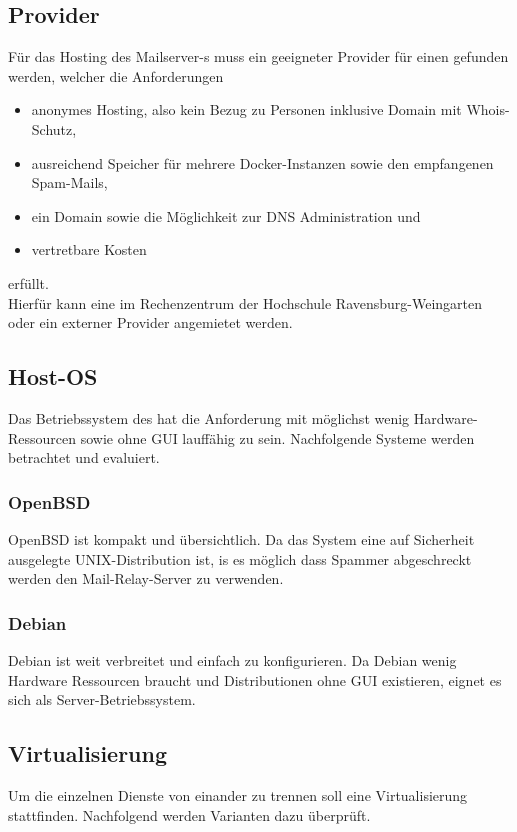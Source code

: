 \documentclass[a4paper,11pt,singlespacing]{article}
\begin{document}
	\subsection{Provider}\label{sec:Provider}
		Für das Hosting des Mailserver-s muss ein geeigneter Provider für einen  gefunden werden, welcher die Anforderungen
		\begin{itemize}
			\item anonymes Hosting, also kein Bezug zu Personen inklusive Domain mit Whois-Schutz,
			\item ausreichend Speicher für mehrere Docker-Instanzen sowie den empfangenen Spam-Mails,
			\item ein Domain sowie die Möglichkeit zur DNS Administration und
			\item vertretbare Kosten
		\end{itemize}
		erfüllt.\\
		Hierfür kann eine  im Rechenzentrum der Hochschule Ravensburg-Weingarten oder ein externer Provider angemietet werden.

	\subsection{Host-OS}\label{sec:Host-Maschine}
		Das Betriebssystem des  hat die Anforderung mit möglichst wenig Hardware-Ressourcen sowie ohne GUI lauffähig zu sein.
		Nachfolgende Systeme werden betrachtet und evaluiert.

		\subsubsection{OpenBSD}\label{sec:OpenBSD}
			OpenBSD ist kompakt und übersichtlich.
			Da das System eine auf Sicherheit ausgelegte UNIX-Distribution ist, is es möglich dass Spammer abgeschreckt werden den Mail-Relay-Server zu verwenden.

		\subsubsection{Debian}\label{sec:Debian}
			Debian ist weit verbreitet und einfach zu konfigurieren.
			Da Debian wenig Hardware Ressourcen braucht und Distributionen ohne GUI existieren, eignet es sich als Server-Betriebssystem.

	\subsection{Virtualisierung}\label{sec:Virtualisierung}
		Um die einzelnen Dienste von einander zu trennen soll eine Virtualisierung stattfinden.
		Nachfolgend werden Varianten dazu überprüft.
\end{document}
